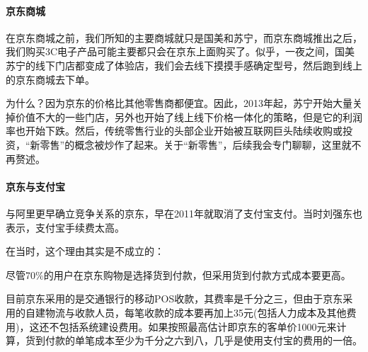 \documentclass[letterpaper,11pt,english]{sphinxmanual}
\begin{document}
\paragraph{京东商城}
\label{\detokenize{chapter_company/jd:id3}}
在京东商城之前，我们所知的主要商城就只是国美和苏宁，而京东商城推出之后，我们购买3C电子产品可能主要都只会在京东上面购买了。似乎，一夜之间，国美苏宁的线下门店都变成了体验店，我们会去线下摸摸手感确定型号，然后跑到线上的京东商城去下单。

为什么？因为京东的价格比其他零售商都便宜。因此，2013年起，苏宁开始大量关掉价值不大的一些门店，另外也开始了线上线下价格一体化的策略，但是它的利润率也开始下跌。然后，传统零售行业的头部企业开始被互联网巨头陆续收购或投资，“新零售”的概念被炒作了起来。关于“新零售”，后续我会专门聊聊，这里就不再赘述。


\paragraph{京东与支付宝}
\label{\detokenize{chapter_company/jd:id4}}
与阿里更早确立竞争关系的京东，早在2011年就取消了支付宝支付。当时刘强东也表示，支付宝手续费太高。
%
\begin{footnote}[898]\sphinxAtStartFootnote
{}
%
\end{footnote}

在当时，这个理由其实是不成立的：

尽管70\%的用户在京东购物是选择货到付款，但采用货到付款方式成本要更高。

目前京东采用的是交通银行的移动POS收款，其费率是千分之三，但由于京东采用的自建物流与收款人员，每笔收款的成本要再加上3\sphinxhyphen{}5元(包括人力成本及其他费用)，这还不包括系统建设费用。如果按照最高估计即京东的客单价1000元来计算，货到付款的单笔成本至少为千分之六到八，几乎是使用支付宝的费用的一倍。%
\begin{footnote}[899]\sphinxAtStartFootnote
{}
%
\end{footnote}
\end{document}
